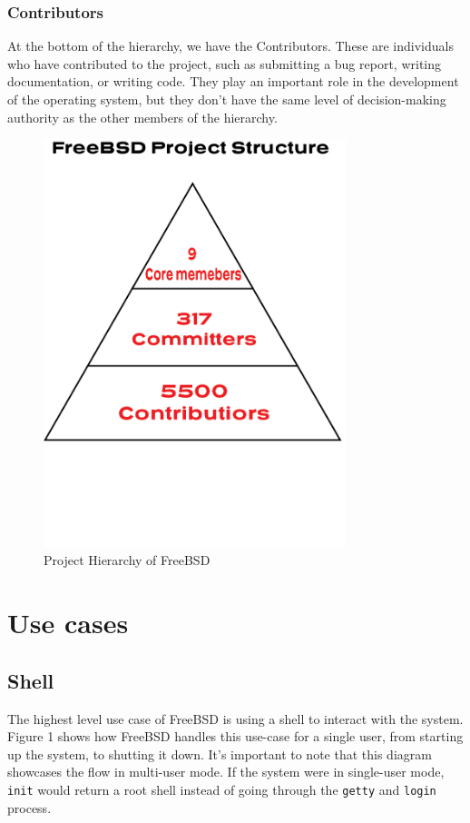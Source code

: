\documentclass[12pt, dvipsnames, a4paper]{article}
\newcommand{\code}[1]{\texttt{#1}}
\begin{document}
\subsubsection{Contributors}
At the bottom of the hierarchy, we have the Contributors. These are individuals who have contributed to the project, such as submitting a bug report, writing documentation, or writing code. They play an important role in the development of the operating system, but they don't have the same level of decision-making authority as the other members of the hierarchy.
\begin{figure}[!htb]
	\centering
	\includegraphics[width = 250pt]{assets/Project_Hierarchy/Project-Structure.png}
	\caption{Project Hierarchy of FreeBSD \cite{dev-model}}
\end{figure}



\clearpage
\section{Use cases}
\subsection{Shell}
The highest level use case of FreeBSD is using a shell to interact with the system.
Figure 1 shows how FreeBSD handles this use-case for a single user,
from starting up the system, to shutting it down. It's important to note that
this diagram showcases the flow in multi-user mode. If the system were in
single-user mode, \code{init} would return a root shell instead of going through the
\code{getty} and \code{login} process\cite{bootprocess}\cite{init}.
\end{document}
